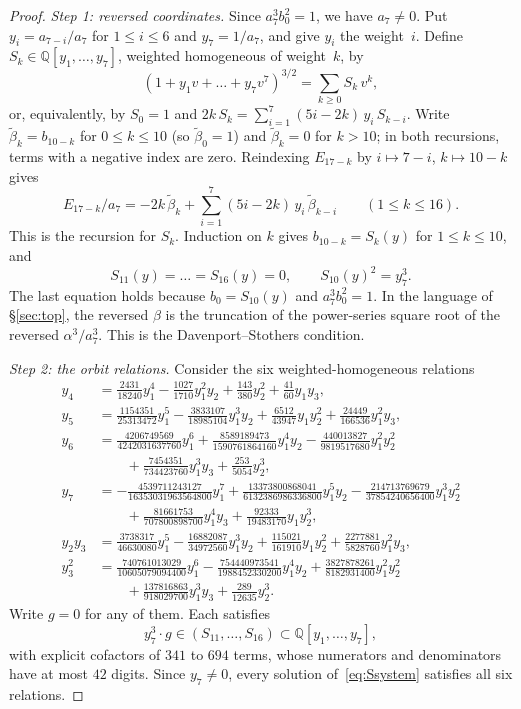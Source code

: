 \documentclass[a4paper,11pt]{article}
\theoremstyle{plain}
\theoremstyle{definition}
\theoremstyle{remark}
\begin{document}
\begin{proof}
\emph{Step 1: reversed coordinates.} Since $a_7^3b_0^2=1$, we have $a_7\neq0$. Put $y_i=a_{7-i}/a_7$ for $1\le i\le 6$ and $y_7=1/a_7$, and give $y_i$ the weight~$i$. Define $S_k\in\mathbb{Q}[y_1,\dots,y_7]$, weighted homogeneous of weight~$k$, by
\[
(1+y_1v+\dots+y_7v^7)^{3/2}=\sum_{k\ge0}S_k\,v^k ,
\]
or, equivalently, by $S_0=1$ and $2k\,S_k=\sum_{i=1}^{7}(5i-2k)\,y_i\,S_{k-i}$. Write $\tilde\beta_k=b_{10-k}$ for $0\le k\le 10$ (so $\tilde\beta_0=1$) and $\tilde\beta_k=0$ for $k>10$; in both recursions, terms with a negative index are zero. Reindexing $E_{17-k}$ by $i\mapsto 7-i$, $k\mapsto 10-k$ gives
\[
E_{17-k}/a_7=-2k\,\tilde\beta_k+\sum_{i=1}^{7}(5i-2k)\,y_i\,\tilde\beta_{k-i}\qquad(1\le k\le 16).
\]
This is the recursion for $S_k$. Induction on $k$ gives $b_{10-k}=S_k(y)$ for $1\le k\le 10$, and
\begin{equation}\label{eq:Ssystem}
S_{11}(y)=\dots=S_{16}(y)=0,\qquad S_{10}(y)^2=y_7^3 .
\end{equation}
The last equation holds because $b_0=S_{10}(y)$ and $a_7^3b_0^2=1$. In the language of \S\ref{sec:top}, the reversed $\beta$ is the truncation of the power-series square root of the reversed $\alpha^3/a_7^3$. This is the Davenport--Stothers condition.

\emph{Step 2: the orbit relations.} Consider the six weighted-homogeneous relations
\begin{align*}
y_4&=\tfrac{2431}{18240}y_1^4-\tfrac{1027}{1710}y_1^2y_2+\tfrac{143}{380}y_2^2+\tfrac{41}{60}y_1y_3,\\
y_5&=\tfrac{1154351}{25313472}y_1^5-\tfrac{3833107}{18985104}y_1^3y_2+\tfrac{6512}{43947}y_1y_2^2+\tfrac{24449}{166536}y_1^2y_3,\\
y_6&=\tfrac{4206749569}{4242031637760}y_1^6+\tfrac{8589189473}{1590761864160}y_1^4y_2-\tfrac{440013827}{9819517680}y_1^2y_2^2\\&\qquad+\tfrac{7454351}{734423760}y_1^3y_3+\tfrac{253}{5054}y_2^3,\\
y_7&=-\tfrac{4539711243127}{16353031963564800}y_1^7+\tfrac{13373800868041}{6132386986336800}y_1^5y_2-\tfrac{214713769679}{37854240656400}y_1^3y_2^2\\&\qquad+\tfrac{81661753}{707800898700}y_1^4y_3+\tfrac{92333}{19483170}y_1y_2^3,\\
y_2y_3&=\tfrac{3738317}{46630080}y_1^5-\tfrac{16882087}{34972560}y_1^3y_2+\tfrac{115021}{161910}y_1y_2^2+\tfrac{2277881}{5828760}y_1^2y_3,\\
y_3^2&=\tfrac{740761013029}{10605079094400}y_1^6-\tfrac{754440973541}{1988452330200}y_1^4y_2+\tfrac{3827878261}{8182931400}y_1^2y_2^2\\&\qquad+\tfrac{137816863}{918029700}y_1^3y_3+\tfrac{289}{12635}y_2^3 .
\end{align*}
Write $g=0$ for any of them. Each satisfies
\[
y_7^3\cdot g\in(S_{11},\dots,S_{16})\subset\mathbb{Q}[y_1,\dots,y_7],
\]
with explicit cofactors of $341$ to $694$ terms, whose numerators and denominators have at most $42$ digits. Since $y_7\neq0$, every solution of~\eqref{eq:Ssystem} satisfies all six relations.


\end{proof}
\end{document}
